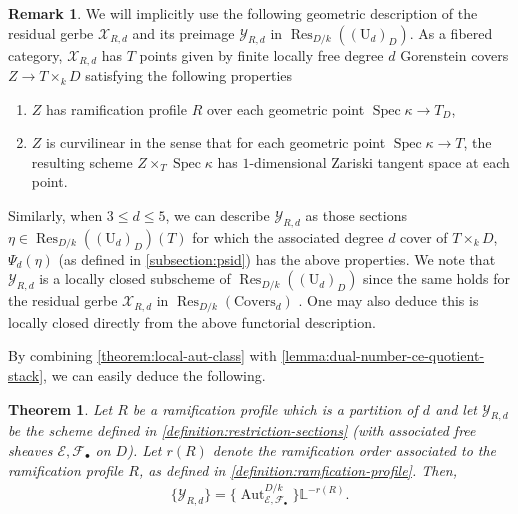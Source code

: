 \documentclass[12 pt]{amsart}
\theoremstyle{plain}
\newtheorem{theorem}[subsection]{Theorem}
\theoremstyle{definition}
\newtheorem{remark}[theorem]{Remark}
\theoremstyle{remark}
\numberwithin{equation}{section}
\newcommand\bl{\mathbb L}
\newcommand\bp{\mathbb P}
\newcommand\sce{\mathscr E}
\newcommand\scf{\mathscr F}
\newcommand\scx{\mathscr X}
\newcommand\scy{\mathscr Y}
\newcommand \ra{\rightarrow}
\DeclareMathOperator\spec{\operatorname{Spec}}
\newcommand\coverstack[1]{\mathrm{Covers}_{d}} %
\newcommand\gorensteinsections[1]{\mathrm{U}_{d}} %
\newcommand\ressections[2]{\scy_{#1,#2}} %
\newcommand\gerbe[2]{\scx_{#1,#2}} %
\DeclareMathOperator\res{Res}
\DeclareMathOperator\aut{Aut}
\begin{document}
\begin{remark}
	\label{remark:functorial-gerbe-description}
	We will implicitly use the following geometric description
	of the residual gerbe $\gerbe R d$ and its preimage $\ressections R d$
	in $\res_{D/k}((\gorensteinsections d)_D)$.
	As a fibered category, $\gerbe R d$ has $T$ points given by 
	finite locally free degree $d$ Gorenstein covers 
	$Z \to T \times_k D$ satisfying the following properties
\begin{enumerate}
	\item $Z$ has ramification
		profile $R$ over each geometric point $\spec \kappa \ra T_D$,
	\item $Z$ is curvilinear in the sense that for each geometric point
		$\spec \kappa \ra T$, the resulting scheme $Z \times_T \spec
		\kappa$ has $1$-dimensional Zariski tangent space at each
		point. 
\end{enumerate}

Similarly, when $3 \leq d \leq 5$, 
we can describe $\ressections R d$ as those sections $\eta \in
\res_{D/k}((\gorensteinsections d)_D)(T)$
for which the associated degree $d$ cover of $T \times_k D$,
$\Psi_d(\eta)$
(as defined in \autoref{subsection:psid})
has the above properties.
We note that $\ressections R d$ is a locally closed subscheme of 
$\res_{D/k}((\gorensteinsections d)_D)$
since the same holds for the residual gerbe $\gerbe R d$ in
$\res_{D/k}(\coverstack d)$
\cite[Thm.\ B.2]{rydh:etale-devissage}.
One may also deduce this is locally closed directly from the above
functorial description.
\end{remark}

By combining \autoref{theorem:local-aut-class}
with \autoref{lemma:dual-number-ce-quotient-stack},
we can easily deduce the following.
\begin{theorem}
	\label{theorem:local-class} 
	Let $R$ be a ramification profile which is
	a partition of $d$ and let $\ressections R d$ 
	be the scheme defined in \autoref{definition:restriction-sections}
	(with
	associated free sheaves $\sce, \scf_\bullet$ on $D$).  
	Let $r(R)$
	denote the ramification order associated to the ramification profile $R$, as
	defined in \autoref{definition:ramfication-profile}. Then,
	\begin{align*} 
			\{\ressections R d\} = \{\aut^{D/k}_{\sce,
		\scf_\bullet}\} \bl^{-r(R)}.
\end{align*} \end{theorem} 
\end{document}

